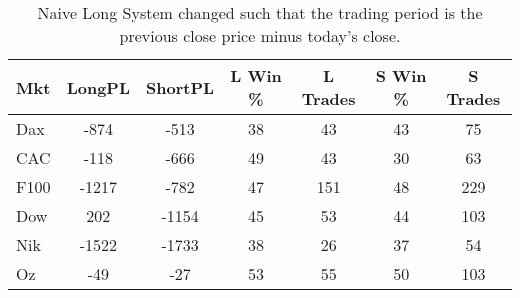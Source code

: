 \begin{table}[ht]
\centering
\caption[Naive Long System - Close to Close]{Naive Long System changed such that the trading period is the previous close price minus today's close.} 
\label{tab:engulf_aroon_results}
\begin{tabular}{lcccccc}
  \toprule Mkt & LongPL & ShortPL & L Win \% & L Trades & S Win \% & S Trades \\ 
  \midrule Dax & -874 & -513 & 38 & 43 & 43 & 75 \\ 
  CAC & -118 & -666 & 49 & 43 & 30 & 63 \\ 
  F100 & -1217 & -782 & 47 & 151 & 48 & 229 \\ 
  Dow & 202 & -1154 & 45 & 53 & 44 & 103 \\ 
  Nik & -1522 & -1733 & 38 & 26 & 37 & 54 \\ 
  Oz & -49 & -27 & 53 & 55 & 50 & 103 \\ 
   \bottomrule \end{tabular}
\end{table}
